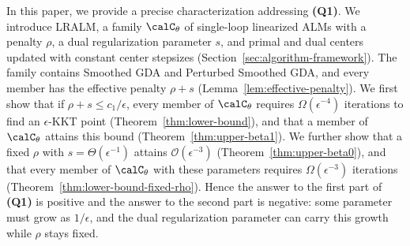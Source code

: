 In this paper, we provide a precise characterization addressing
\textbf{(Q1)}. We introduce LRALM, a family $\calC_\theta$ of single-loop
linearized ALMs with a penalty $\rho$, a dual regularization parameter $s$, and
primal and dual centers updated with constant center stepsizes
(Section~\ref{sec:algorithm-framework}). The family contains Smoothed GDA and
Perturbed Smoothed GDA, and every member has the effective penalty $\rho+s$
(Lemma~\ref{lem:effective-penalty}). We first show that if
$\rho+s\le c_1/\epsilon$, every member of $\calC_\theta$ requires
$\Omega(\epsilon^{-4})$ iterations to find an $\epsilon$-KKT point
(Theorem~\ref{thm:lower-bound}), and that a member of $\calC_\theta$ attains
this bound (Theorem~\ref{thm:upper-beta1}). We further show that a fixed $\rho$
with $s=\Theta(\epsilon^{-1})$ attains $\mathcal O(\epsilon^{-3})$
(Theorem~\ref{thm:upper-beta0}), and that every member of $\calC_\theta$ with
these parameters requires $\Omega(\epsilon^{-3})$ iterations
(Theorem~\ref{thm:lower-bound-fixed-rho}). Hence the answer to the first part
of \textbf{(Q1)} is positive and the answer to the second part is negative:
some parameter must grow as $1/\epsilon$, and the dual regularization
parameter can carry this growth while $\rho$ stays fixed.

